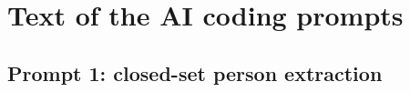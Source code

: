 \documentclass[12pt]{article}
\theoremstyle{definition}
\theoremstyle{remark}
\begin{document}




\section{Text of the AI coding prompts}
\label{app:prompts}


\subsection{Prompt 1: closed-set person extraction}
\label{app:prompt-extraction}
\end{document}
